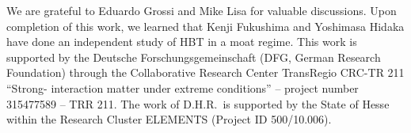 \documentclass[reprint,superscriptaddress,english,preprintnumbers,amsmath,amssymb,aps,prx]{revtex4-2}
\begin{document}
\begin{acknowledgments}
We are grateful to Eduardo Grossi and Mike Lisa for valuable discussions. Upon completion of this work, we learned that Kenji Fukushima and Yoshimasa Hidaka have done an independent study of HBT in a moat regime. This work is supported by the
Deutsche Forschungsgemeinschaft (DFG, German Research Foundation)
through the Collaborative Research Center TransRegio
CRC-TR 211 ``Strong- interaction matter under extreme conditions'' -- project number
315477589 -- TRR 211. The work of D.H.R.\ is supported 
by the State of Hesse within the Research Cluster
ELEMENTS (Project ID 500/10.006).
\end{acknowledgments}


\end{document}
